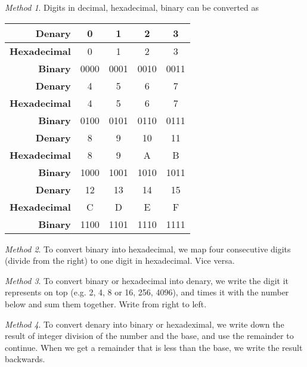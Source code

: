 \documentclass[8pt]{article}
\theoremstyle{remark}
\newtheorem{method}{Method}[subsection]
\begin{document}
        \begin{method}
            Digits in decimal, hexadecimal, binary can be converted as
            \begin{center}
                \begin{tabular}{r|c|c|c|c}
                    \textbf{Denary} & 0 & 1 & 2 & 3\\\hline
                    \textbf{Hexadecimal} & 0 & 1 & 2 & 3\\\hline
                    \textbf{Binary} & 0000 & 0001 & 0010 & 0011\\\hline\hline
                    \textbf{Denary} & 4 & 5 & 6 & 7\\\hline
                    \textbf{Hexadecimal} & 4 & 5 & 6 & 7\\\hline
                    \textbf{Binary} & 0100 & 0101 & 0110 & 0111\\\hline\hline
                    \textbf{Denary} & 8 & 9 & 10 & 11\\\hline
                    \textbf{Hexadecimal} & 8 & 9 & A & B\\\hline
                    \textbf{Binary} & 1000 & 1001 & 1010 & 1011\\\hline\hline
                    \textbf{Denary} & 12 & 13 & 14 & 15\\\hline
                    \textbf{Hexadecimal} & C & D & E & F\\\hline
                    \textbf{Binary} & 1100 & 1101 & 1110 & 1111\\
                \end{tabular}
            \end{center}
        \end{method}
        
        \begin{method}
            To convert binary into hexadecimal, we map four consecutive digits (divide from the right) to one digit in hexadecimal. Vice versa.
        \end{method}

        \begin{method}
            To convert binary or hexadecimal into denary, we write the digit it represents on top (e.g. 2, 4, 8 or 16, 256, 4096), and times it with the number below and sum them together. Write from right to left.
        \end{method}

        \begin{method}
            To convert denary into binary or hexadeximal, we write down the result of integer division of the number and the base, and use the remainder to continue. When we get a remainder that is less than the base, we write the result backwards.
        \end{method}
\end{document}
